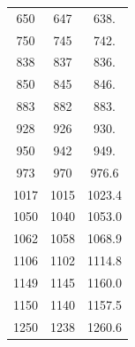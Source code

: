\begin{table}[!htbp]
\begin{minipage}[t]{0.5\textwidth}
\begin{tabular}{ccc}
      650  &  647  & 638. \\
      750  &  745  & 742. \\
      838  &  837  & 836. \\
      850  &  845  & 846. \\
      883  &  882  & 883. \\
      928  &  926  & 930. \\
      950  &  942  & 949. \\
      973  &  970  & 976.6  \\
      1017 &  1015 & 1023.4 \\
      1050 &  1040 & 1053.0 \\
      1062 &  1058 & 1068.9 \\
      1106 &  1102 & 1114.8 \\
      1149 &  1145 & 1160.0 \\
      1150 &  1140 & 1157.5 \\
      1250 &  1238 & 1260.6 \\
      \hline
    \end{tabular}

  \end{minipage}

\end{table}







